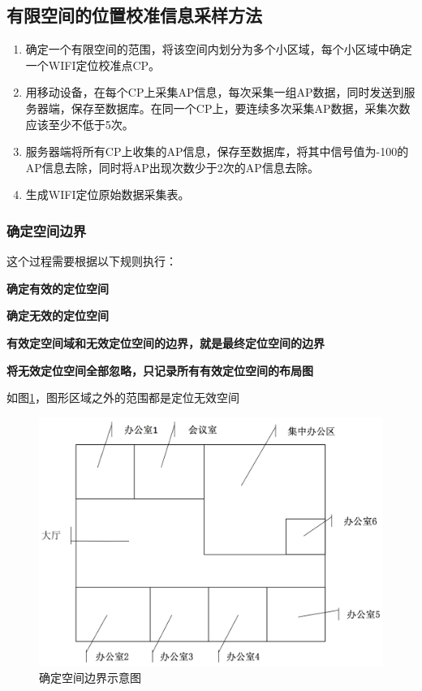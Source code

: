 \documentclass[UTF8, twocolumn ]{ctexart}
\begin{document}
\subsection{有限空间的位置校准信息采样方法}
\begin{enumerate}
\item 确定一个有限空间的范围，将该空间内划分为多个小区域，每个小区域中确定一个WIFI定位校准点CP。
\item 用移动设备，在每个CP上采集AP信息，每次采集一组AP数据，同时发送到服务器端，保存至数据库。在同一个CP上，要连续多次采集AP数据，采集次数应该至少不低于5次。
\item 服务器端将所有CP上收集的AP信息，保存至数据库，将其中信号值为-100的AP信息去除，同时将AP出现次数少于2次的AP信息去除。
\item 生成WIFI定位原始数据采集表。
\end{enumerate}

\subsubsection{确定空间边界}
这个过程需要根据以下规则执行：
\begin{compactitem}
\item\textbf{确定有效的定位空间}
\item\textbf{确定无效的定位空间}
\item\textbf{有效定空间域和无效定位空间的边界，就是最终定位空间的边界}
\item\textbf{将无效定位空间全部忽略，只记录所有有效定位空间的布局图}
\end{compactitem}
\par
如图\ref{fig:no2}，图形区域之外的范围都是定位无效空间
\begin{figure}[!ht]\centering
  \includegraphics[keepaspectratio, scale=0.2]{no2.png}
  \caption{确定空间边界示意图\label{fig:no2}} 
\end{figure}
\end{document}
